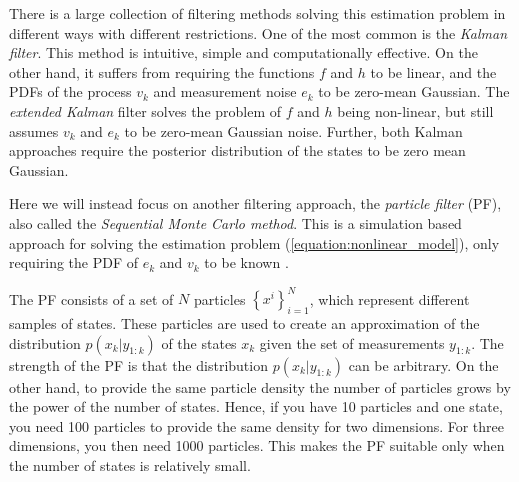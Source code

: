 \documentclass{LTHthesis}
\begin{document}
There is a large collection of filtering methods solving this estimation problem in different ways with different restrictions. One of the most common is the \emph{Kalman filter}. This method is intuitive, simple and computationally effective. On the other hand, it suffers from requiring the functions $f$ and $h$ to be linear, and the PDFs of the process $v_k$ and measurement noise $e_k$ to be zero-mean Gaussian. The \emph{extended Kalman} filter solves the problem of $f$ and $h$ being non-linear, but still assumes $v_k$ and $e_k$ to be zero-mean Gaussian noise. Further, both Kalman approaches require the posterior distribution of the states to be zero mean Gaussian.

Here we will instead focus on another filtering approach, the \emph{particle filter} (PF), also called the \emph{Sequential Monte Carlo method}. This is a simulation based approach for solving the estimation problem (\ref{equation:nonlinear_model}), only requiring the PDF of $e_k$ and $v_k$ to be known \cite{gson12,fig_fra10}.  

The PF consists of a set of $N$ particles $\left\{x^i\right\}_{i=1}^N$, which represent different samples of states. These particles are used to create an approximation of the distribution $p(x_k|y_{1:k})$  of the states $x_k$ given the set of measurements $y_{1:k}$. The strength of the PF is that the distribution $p(x_k|y_{1:k})$ can be arbitrary. On the other hand, to provide the same particle density the number of particles grows by the power of the number of states. Hence, if you have 10 particles and one state, you need 100 particles to provide the same density for two dimensions. For three dimensions, you then need 1000 particles. This makes the PF suitable only when the number of states is relatively small.
%
\end{document}
